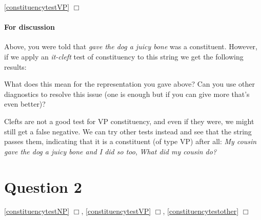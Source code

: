 \documentclass{article}
\begin{document}
\hfill{}\ref{constituencytestVP} $\Box$

\paragraph{For discussion} Above, you were told that \emph{gave the dog a juicy bone} was a constituent.
However, if we apply an \emph{it-cleft} test of constituency to this string we get the following results:
\begin{exe}
\end{exe}
What does this mean for the representation you gave above?
Can you use other diagnostics to resolve this issue (one is enough but if you can give more that's even better)?

\begin{answer}
{
Clefts are not a good test for VP constituency, and even if they were, we might still get a false negative. We can try other tests instead and see that the string passes them, indicating that it is a constituent (of type VP) after all: \emph{My cousin gave the dog a juicy bone and I did so too}, \emph{What did my cousin do?}
}
\end{answer}

\section*{Question 2}
\hfill{}
\ref{constituencytestNP} $\Box$,
\ref{constituencytestVP} $\Box$,
\ref{constituencytestother} $\Box$
\end{document}
